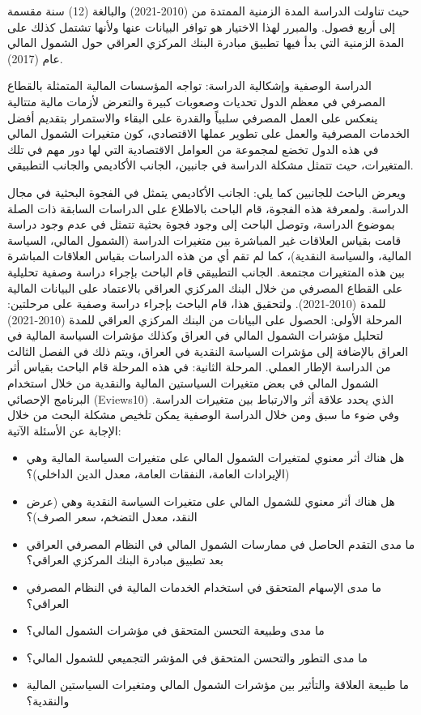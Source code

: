 \documentclass[10pt,a4paper]{report}
\begin{document}
\begin{doublespacing}
حيث تناولت الدراسة المدة الزمنية الممتدة من (2010-2021) والبالغة (12) سنة مقسمة إلى أربع فصول. والمبرر لهذا الاختيار هو توافر البيانات عنها ولأنها تشتمل كذلك على المدة الزمنية التي بدأ فيها تطبيق مبادرة البنك المركزي العراقي حول الشمول المالي عام (2017).

الدراسة الوصفية وإشكالية الدراسة: تواجه المؤسسات المالية المتمثلة بالقطاع المصرفي في معظم الدول تحديات وصعوبات كبيرة والتعرض لأزمات مالية متتالية ينعكس على العمل المصرفي سلبياً والقدرة على البقاء والاستمرار بتقديم أفضل الخدمات المصرفية والعمل على تطوير عملها الاقتصادي، كون متغيرات الشمول المالي في هذه الدول تخضع لمجموعة من العوامل الاقتصادية التي لها دور مهم في تلك المتغيرات، حيث تتمثل مشكلة الدراسة في جانبين، الجانب الأكاديمي والجانب التطبيقي.

ويعرض الباحث للجانبين كما يلي:
الجانب الأكاديمي يتمثل في الفجوة البحثية في مجال الدراسة. ولمعرفة هذه الفجوة، قام الباحث بالاطلاع على الدراسات السابقة ذات الصلة بموضوع الدراسة، وتوصل الباحث إلى وجود فجوة بحثية تتمثل في عدم وجود دراسة قامت بقياس العلاقات غير المباشرة بين متغيرات الدراسة (الشمول المالي، السياسة المالية، والسياسة النقدية)، كما لم تقم أي من هذه الدراسات بقياس العلاقات المباشرة بين هذه المتغيرات مجتمعة. الجانب التطبيقي قام الباحث بإجراء دراسة وصفية تحليلية على القطاع المصرفي من خلال البنك المركزي العراقي بالاعتماد على البيانات المالية للمدة (2010-2021). ولتحقيق هذا، قام الباحث بإجراء دراسة وصفية على مرحلتين:
المرحلة الأولى: الحصول على البيانات من البنك المركزي العراقي للمدة (2010-2021) لتحليل مؤشرات الشمول المالي في العراق وكذلك مؤشرات السياسة المالية في العراق بالإضافة إلى مؤشرات السياسة النقدية في العراق، ويتم ذلك في الفصل الثالث من الدراسة الإطار العملي.
المرحلة الثانية: في هذه المرحلة قام الباحث بقياس أثر الشمول المالي في بعض متغيرات السياستين المالية والنقدية من خلال استخدام البرنامج الإحصائي (Eviews10) الذي يحدد علاقة أثر والارتباط بين متغيرات الدراسة.
وفي ضوء ما سبق ومن خلال الدراسة الوصفية يمكن تلخيص مشكلة البحث من خلال الإجابة عن الأسئلة الآتية:
 
\begin{itemize}
	\item هل هناك أثر معنوي لمتغيرات الشمول المالي على متغيرات السياسة المالية وهي (الإيرادات العامة، النفقات العامة، معدل الدين الداخلي)؟
	\item هل هناك أثر معنوي للشمول المالي على متغيرات السياسة النقدية وهي (عرض النقد، معدل التضخم، سعر الصرف)؟
	\item ما مدى التقدم الحاصل في ممارسات الشمول المالي في النظام المصرفي العراقي بعد تطبيق مبادرة البنك المركزي العراقي؟
	\item ما مدى الإسهام المتحقق في استخدام الخدمات المالية في النظام المصرفي العراقي؟
	\item ما مدى وطبيعة التحسن المتحقق في مؤشرات الشمول المالي؟
	\item ما مدى التطور والتحسن المتحقق في المؤشر التجميعي للشمول المالي؟
	\item ما طبيعة العلاقة والتأثير بين مؤشرات الشمول المالي ومتغيرات السياستين المالية والنقدية؟
\end{itemize}


\end{doublespacing}
\end{document}
